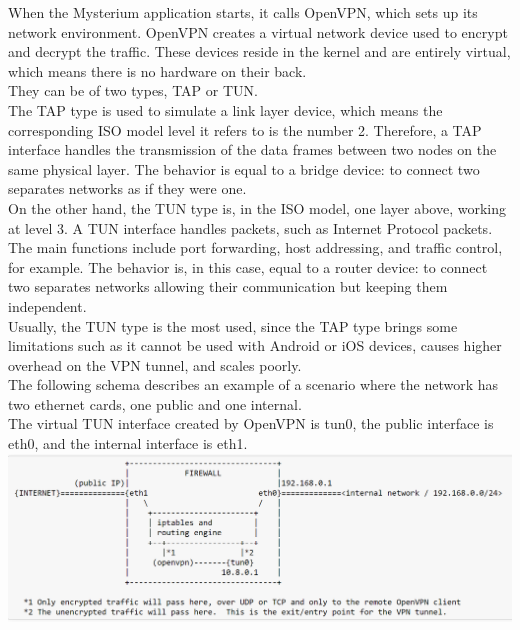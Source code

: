 \documentclass[]{article}
\begin{document}
	When the Mysterium application starts, it calls OpenVPN, which sets up its network environment. OpenVPN creates a virtual network device used to encrypt and decrypt the traffic. These devices reside in the kernel and are entirely virtual, which means there is no hardware on their back.\\They can be of two types, TAP or TUN.\\
	The TAP type is used to simulate a link layer device, which means the corresponding ISO model level it refers to is the number 2. Therefore, a TAP interface handles the transmission of the data frames between two nodes on the same physical layer. The behavior is equal to a bridge device: to connect two separates networks as if they were one.\\
	On the other hand, the TUN type is, in the ISO model, one layer above, working at level 3. A TUN interface handles packets, such as Internet Protocol packets. The main functions include port forwarding, host addressing, and traffic control, for example. The behavior is, in this case, equal to a router device: to connect two separates networks allowing their communication but keeping them independent.\\
	Usually, the TUN type is the most used, since the TAP type brings some limitations such as it cannot be used with Android or iOS devices, causes higher overhead on the VPN tunnel, and scales poorly.\\
	The following schema describes an example of a scenario where the network has two ethernet cards, one public and one internal.\\
	The virtual TUN interface created by OpenVPN is tun0, the public interface is eth0, and the internal interface is eth1.\\

	\includegraphics[width=1\textwidth]{"images/openvpn_routing_setup.PNG"}
\end{document}
